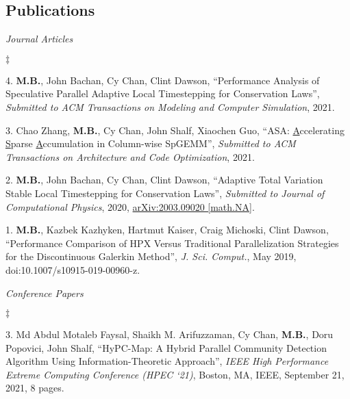 \documentclass[margin,line]{res}
\newenvironment{list2}{
  \begin{list}{$\ddagger$}{%
      \setlength{\itemsep}{0in}
      \setlength{\parsep}{0in} \setlength{\parskip}{0in}
      \setlength{\topsep}{0in} \setlength{\partopsep}{0in}
      \setlength{\leftmargin}{0.2in}}}{\end{list}}
\newcommand{\article}[5]{%
#1, ``#2'', {\it #3}, #4, #5.%
}
\newcommand{\submitted}[4]{%
#1, ``#2'', {\it Submitted to #3}, #4.%
}
\newcommand{\inproceeding}[7]{%
#1, ``#2'', {\it #3}, #4, #5, #6, #7 pages.%
}
\begin{document}
\begin{resume}
\clearpage
\section{\sc Publications}
\textit{Journal Articles}
\vspace{0.05in}
\begin{list2}
\item[4.] \submitted{{\bf M.B.}, John Bachan, Cy Chan, Clint Dawson}{Performance Analysis of Speculative Parallel Adaptive Local Timestepping for Conservation Laws}{ACM Transactions on Modeling and Computer Simulation}{2021}
\item[3.] \submitted{Chao Zhang, {\bf M.B.}, Cy Chan, John Shalf, Xiaochen Guo}{ASA: \underline{A}ccelerating \underline{S}parse \underline{A}ccumulation in Column-wise SpGEMM}{ACM Transactions on Architecture and Code Optimization}{2021}
\item[2.] \article{{\bf M.B.}, John Bachan, Cy Chan, Clint Dawson}{Adaptive Total Variation Stable Local Timestepping for Conservation Laws}{Submitted to Journal of Computational Physics}{2020}{\newline \href{https://arxiv.org/abs/2003.09020}{arXiv:2003.09020 [math.NA]}}
\item[1.] \article{{\bf M.B.}, Kazbek Kazhyken, Hartmut Kaiser, Craig Michoski, Clint Dawson}{Performance Comparison of HPX Versus Traditional Parallelization Strategies for the Discontinuous Galerkin Method}{J. Sci. Comput.}{May 2019}{doi:10.1007/s10915-019-00960-z}
\end{list2}
\textit{Conference Papers}
\vspace{0.05in}
\begin{list2}
\item[3.] \inproceeding{Md Abdul Motaleb Faysal, Shaikh M. Arifuzzaman, Cy Chan, {\bf M.B.}, Doru Popovici, John Shalf}{{HyPC-Map}: {A} Hybrid Parallel Community Detection Algorithm Using Information-Theoretic Approach}{IEEE High Performance Extreme Computing Conference (HPEC ‘21)}{Boston, MA}{IEEE}{September 21, 2021}{8}

\end{list2}
\end{resume}
\end{document}
